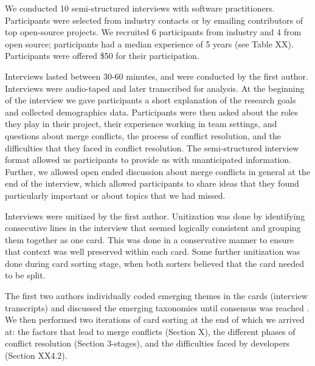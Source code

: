 We conducted 10 semi-structured interviews with software practitioners. Participants were selected from industry contacts or by emailing contributors of top open-source projects. We recruited 6 participants from industry and 4 from open source; participants had a median experience of 5 years (see Table XX). Participants were offered \$50 for their participation.  

Interviews lasted between 30-60 minutes, and were conducted by the first author. Interviews were audio-taped and later transcribed for analysis. At the beginning of the interview we gave participants a short explanation of the research goals and collected demographics data. Participants were then asked about the roles they play in their project, their experience working in team settings, and questions about merge conflicts, the process of conflict resolution, and the difficulties that they faced in conflict resolution. The semi-structured interview format allowed us participants to provide us with unanticipated information. Further, we allowed open ended discussion about merge conflicts in general at the end of the interview, which allowed participants to share ideas that they found particularly important or about topics that we had missed. 


Interviews were unitized \cite{unitization} by the first author. Unitization was done by identifying consecutive lines in the interview that seemed logically consistent and grouping them together as one card. This was done in a conservative manner to ensure that context was well preserved within each card. Some further unitization was done during card sorting stage, when both sorters believed that the card needed to be split.


The first two authors individually coded emerging themes in the cards (interview transcripts) and discussed the emerging taxonomies until consensus was reached \cite{card_sort}. We then performed two iterations of card sorting at the end of which we arrived at: the factors that lead to merge conflicts (Section X), the different phases of conflict resolution (Section 3-stages), and the difficulties faced by developers (Section XX4.2).


